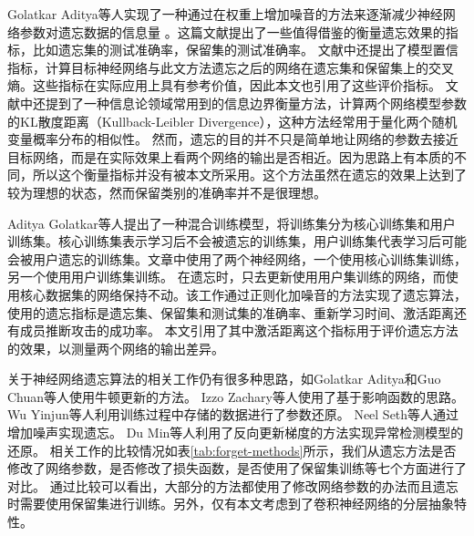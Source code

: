 Golatkar Aditya等人\cite{Golatkar_2020_CVPR}实现了一种通过在权重上增加噪音的方法来逐渐减少神经网络参数对遗忘数据的信息量
。这篇文献提出了一些值得借鉴的衡量遗忘效果的指标，比如遗忘集的测试准确率，保留集的测试准确率。
文献中还提出了模型置信指标，计算目标神经网络与此文方法遗忘之后的网络在遗忘集和保留集上的交叉熵。这些指标在实际应用上具有参考价值，因此本文也引用了这些评价指标。
文献中还提到了一种信息论领域常用到的信息边界衡量方法，计算两个网络模型参数的KL散度距离（Kullback-Leibler Divergence），这种方法经常用于量化两个随机变量概率分布的相似性。
然而，遗忘的目的并不只是简单地让网络的参数去接近目标网络，而是在实际效果上看两个网络的输出是否相近。因为思路上有本质的不同，所以这个衡量指标并没有被本文所采用。这个方法虽然在遗忘的效果上达到了较为理想的状态，然而保留类别的准确率并不是很理想。

Aditya Golatkar等人\cite{Golatkar_2021_CVPR}提出了一种混合训练模型，将训练集分为核心训练集和用户训练集。核心训练集表示学习后不会被遗忘的训练集，用户训练集代表学习后可能会被用户遗忘的训练集。文章中使用了两个神经网络，一个使用核心训练集训练，另一个使用用户训练集训练。
在遗忘时，只去更新使用用户集训练的网络，而使用核心数据集的网络保持不动。该工作通过正则化加噪音的方法实现了遗忘算法，使用的遗忘指标是遗忘集、保留集和测试集的准确率、重新学习时间、激活距离还有成员推断攻击的成功率。
本文引用了其中激活距离这个指标用于评价遗忘方法的效果，以测量两个网络的输出差异。

关于神经网络遗忘算法的相关工作仍有很多种思路，如Golatkar Aditya\cite{10.1007/978-3-030-58526-6_23}和Guo Chuan\cite{pmlr-v119-guo20c}等人使用牛顿更新的方法。
Izzo Zachary等人\cite{pmlr-v130-izzo21a}使用了基于影响函数\cite{pmlr-v70-koh17a,cook_weisberg_1982}的思路。
Wu Yinjun等人\cite{pmlr-v119-wu20b}利用训练过程中存储的数据进行了参数还原。
Neel Seth等人\cite{pmlr-v132-neel21a}通过增加噪声实现遗忘。
Du Min等人\cite{10.1145/3319535.3363226}利用了反向更新梯度的方法实现异常检测模型的还原。
相关工作的比较情况如表\ref{tab:forget-methods}所示，我们从遗忘方法是否修改了网络参数，是否修改了损失函数，是否使用了保留集训练等七个方面进行了对比。
通过比较可以看出，大部分的方法都使用了修改网络参数的办法而且遗忘时需要使用保留集进行训练。另外，仅有本文考虑到了卷积神经网络的分层抽象特性。

